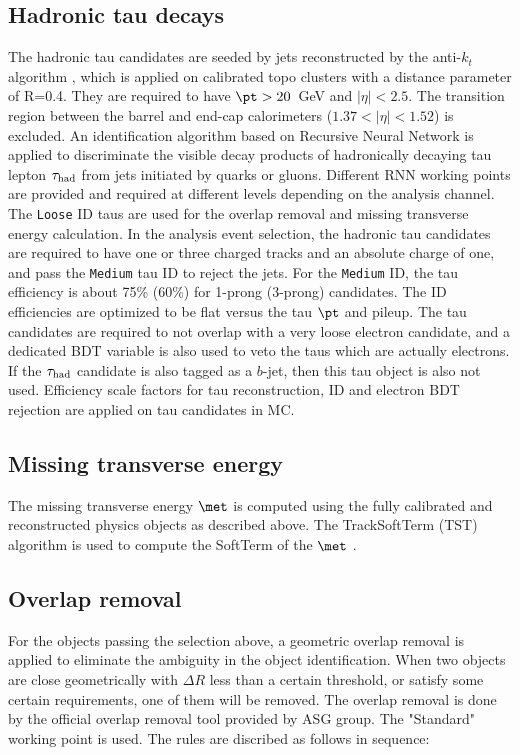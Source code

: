 \subsection{Hadronic tau decays}
The hadronic tau candidates \cite{tau_sys1} are seeded by jets reconstructed by the anti-$k_t$ algorithm \cite{antikt}, which is applied on calibrated topo clusters \cite{topocluster} with a distance parameter of R=0.4. They are required to have $\pt > 20$~GeV and $|\eta|<2.5$. The transition region between the barrel and end-cap calorimeters ($1.37<|\eta|<1.52$) is excluded. An identification algorithm based on Recursive Neural Network \cite{tau_sys2} is applied to discriminate the visible decay products of hadronically decaying tau lepton $\tau_\text{had}$ from jets initiated by quarks or gluons. Different RNN working points are provided and required at different levels depending on the analysis channel. %
The \texttt{Loose} ID taus are used for the overlap removal and missing transverse energy calculation.
In the analysis event selection, the hadronic tau candidates are required to have one or three charged tracks and an absolute charge of one, and pass the \texttt{Medium} tau ID to reject the jets.
For the \texttt{Medium} ID, the tau efficiency is about 75\% (60\%) for 1-prong (3-prong) candidates. The ID efficiencies are optimized to be flat versus the tau $\pt$ and pileup.
The tau candidates are required to not overlap with a very loose electron candidate, and a dedicated BDT variable is also used to veto the taus which are actually electrons.
If the $\tau_\text{had}$ candidate is also tagged as a $b$-jet, then this tau object is also not used. Efficiency scale factors for tau reconstruction, ID and electron BDT rejection \cite{TauCP} are applied on tau candidates in MC.

\subsection{Missing transverse energy}
The missing transverse energy $\met$ is computed using the fully calibrated and reconstructed physics objects as described above. The TrackSoftTerm (TST) algorithm is used to compute the SoftTerm of the $\met$ \cite{MET}. 

\subsection{Overlap removal}
For the objects passing the selection above, a geometric overlap removal is applied to eliminate the ambiguity in the object identification.  When two objects are close geometrically with $\Delta R$ less than a certain threshold, or satisfy some certain requirements, one of them will be removed. The overlap removal is done by the official overlap removal tool provided by ASG group. The "Standard" working point is used. The rules are discribed as follows in sequence:

